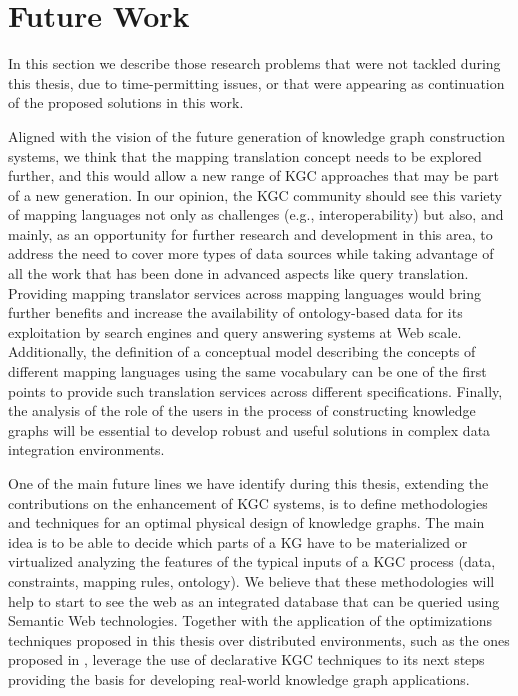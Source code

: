 \section{Future Work}
In this section we describe those research problems that were not tackled during this thesis, due to time-permitting issues, or that were appearing as continuation of the proposed solutions in this work.

Aligned with the vision of the future generation of knowledge graph construction systems, we think that the mapping translation concept needs to be explored further, and this would allow a new range of KGC approaches that may be part of a new generation. In our opinion, the KGC community should see this variety of mapping languages not only as challenges (e.g., interoperability) but also, and mainly, as an opportunity for further research and development in this area, to address the need to cover more types of data sources while taking advantage of all the work that has been done in advanced aspects like query translation. Providing mapping translator services across mapping languages would bring further benefits and increase the availability of ontology-based data for its exploitation by search engines and query answering systems at Web scale. Additionally, the definition of a conceptual model describing the concepts of different mapping languages using the same vocabulary can be one of the first points to provide such translation services across different specifications. Finally, the analysis of the role of the users in the process of constructing knowledge graphs will be essential to develop robust and useful solutions in complex data integration environments.

One of the main future lines we have identify during this thesis, extending the contributions on the enhancement of KGC systems, is to define methodologies and techniques for an optimal physical design of knowledge graphs. The main idea is to be able to decide which parts of a KG have to be materialized or virtualized analyzing the features of the typical inputs of a KGC process (data, constraints, mapping rules, ontology). We believe that these methodologies will help to start to see the web as an integrated database that can be queried using Semantic Web technologies. Together with the application of the optimizations techniques proposed in this thesis over distributed environments, such as the ones proposed in \citep{endris2019ontario,mami2019squerall}, leverage the use of declarative KGC techniques to its next steps providing the basis for developing real-world knowledge graph applications.

